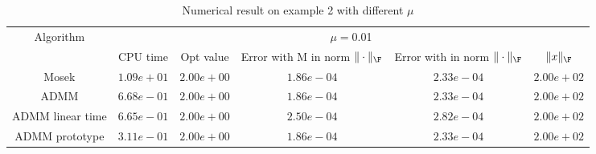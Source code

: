 \begin{table}
\centering
\begin{tabular}{|c|c|c|c|c|c|}

\hline
\multirow{2}{*}{ Algorithm} &\multicolumn{5}{c|}{$\mu=$0.01}\\\cline{2-6}
 &CPU time &Opt value &Error with M in norm $\|\cdot\|_\F$ &Error with in norm $\|\cdot\|_\F$ &$\|x\|_\F$\\\hline
Mosek & $1.09e+01$ & $2.00e+00$ & $1.86e-04$ & $2.33e-04$ & $2.00e+02$\\\hline
ADMM & $6.68e-01$ & $2.00e+00$ & $1.86e-04$ & $2.33e-04$ & $2.00e+02$\\\hline
ADMM linear time & $6.65e-01$ & $2.00e+00$ & $2.50e-04$ & $2.82e-04$ & $2.00e+02$\\\hline
ADMM prototype & $3.11e-01$ & $2.00e+00$ & $1.86e-04$ & $2.33e-04$ & $2.00e+02$\\\hline
\end{tabular}
\caption{Numerical result on example 2 with different $\mu$\label{example2}}
\end{table}
